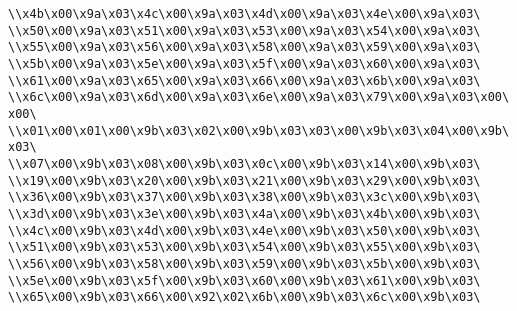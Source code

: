 \verb|\\x4b\x00\x9a\x03\x4c\x00\x9a\x03\x4d\x00\x9a\x03\x4e\x00\x9a\x03\|\newline
\verb|\\x50\x00\x9a\x03\x51\x00\x9a\x03\x53\x00\x9a\x03\x54\x00\x9a\x03\|\newline
\verb|\\x55\x00\x9a\x03\x56\x00\x9a\x03\x58\x00\x9a\x03\x59\x00\x9a\x03\|\newline
\verb|\\x5b\x00\x9a\x03\x5e\x00\x9a\x03\x5f\x00\x9a\x03\x60\x00\x9a\x03\|\newline
\verb|\\x61\x00\x9a\x03\x65\x00\x9a\x03\x66\x00\x9a\x03\x6b\x00\x9a\x03\|\newline
\verb|\\x6c\x00\x9a\x03\x6d\x00\x9a\x03\x6e\x00\x9a\x03\x79\x00\x9a\x03\x00\x00\|\newline
\verb|\\x01\x00\x01\x00\x9b\x03\x02\x00\x9b\x03\x03\x00\x9b\x03\x04\x00\x9b\x03\|\newline
\verb|\\x07\x00\x9b\x03\x08\x00\x9b\x03\x0c\x00\x9b\x03\x14\x00\x9b\x03\|\newline
\verb|\\x19\x00\x9b\x03\x20\x00\x9b\x03\x21\x00\x9b\x03\x29\x00\x9b\x03\|\newline
\verb|\\x36\x00\x9b\x03\x37\x00\x9b\x03\x38\x00\x9b\x03\x3c\x00\x9b\x03\|\newline
\verb|\\x3d\x00\x9b\x03\x3e\x00\x9b\x03\x4a\x00\x9b\x03\x4b\x00\x9b\x03\|\newline
\verb|\\x4c\x00\x9b\x03\x4d\x00\x9b\x03\x4e\x00\x9b\x03\x50\x00\x9b\x03\|\newline
\verb|\\x51\x00\x9b\x03\x53\x00\x9b\x03\x54\x00\x9b\x03\x55\x00\x9b\x03\|\newline
\verb|\\x56\x00\x9b\x03\x58\x00\x9b\x03\x59\x00\x9b\x03\x5b\x00\x9b\x03\|\newline
\verb|\\x5e\x00\x9b\x03\x5f\x00\x9b\x03\x60\x00\x9b\x03\x61\x00\x9b\x03\|\newline
\verb|\\x65\x00\x9b\x03\x66\x00\x92\x02\x6b\x00\x9b\x03\x6c\x00\x9b\x03\|\newline
